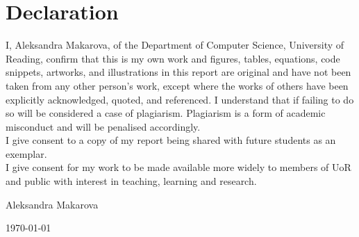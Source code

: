 \documentclass[a4paper,11pt,oneside]{book}
\begin{document}
    
    \newpage
    \thispagestyle{empty}
    \chapter*{\Large Declaration}
    I,
     Aleksandra Makarova, %
    of the Department of Computer Science, University of Reading, confirm that this is my own work and figures, tables, equations, code snippets, artworks, and illustrations in this report are original and have not been taken from any other person's work, except where the works of others have been explicitly acknowledged, quoted, and referenced. I understand that if failing to do so will be considered a case of plagiarism. Plagiarism is a form of academic misconduct and will be penalised accordingly. \\
    
    \noindent
    I give consent to a copy of my report being shared with future students as an exemplar. \\
    
    \noindent
    I give consent for my work to be made available more widely to members of UoR and public with interest in teaching, learning and research. 
    ~\\[1cm]
    \begin{flushright}
	Aleksandra Makarova %
    
    \today
    \end{flushright}

     
    
\end{document}
